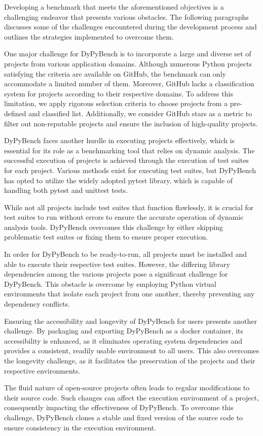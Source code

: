 Developing a benchmark that meets the aforementioned objectives is a challenging endeavor that presents various obstacles. The following paragraphs discusses some of the challenges encountered during the development process and outlines the strategies implemented to overcome them.

One major challenge for DyPyBench is to incorporate a large and diverse set of projects from various application domains.
Although numerous Python projects satisfying the criteria are available on GitHub, the benchmark can only accommodate a limited number of them.
Moreover, GitHub lacks a classification system for projects according to their respective domains.
To address this limitation, we apply rigorous selection criteria to choose projects from a pre-defined and classified list.
Additionally, we consider GitHub stars as a metric to filter out non-reputable projects and ensure the inclusion of high-quality projects.

DyPyBench faces another hurdle in executing projects effectively, which is essential for its role as a benchmarking tool that relies on dynamic analysis.
The successful execution of projects is achieved through the execution of test suites for each project.
Various methods exist for executing test suites, but DyPyBench has opted to utilize the widely adopted pytest library, which is capable of handling both pytest and unittest tests.

While not all projects include test suites that function flawlessly, it is crucial for test suites to run without errors to ensure the accurate operation of dynamic analysis tools.
DyPyBench overcomes this challenge by either skipping problematic test suites or fixing them to ensure proper execution.

In order for DyPyBench to be ready-to-run, all projects must be installed and able to execute their respective test suites.
However, the differing library dependencies among the various projects pose a significant challenge for DyPyBench.
This obstacle is overcome by employing Python virtual environments that isolate each project from one another, thereby preventing any dependency conflicts.

Ensuring the accessibility and longevity of DyPyBench for users presents another challenge.
By packaging and exporting DyPyBench as a docker container, its accessibility is enhanced, as it eliminates operating system dependencies and provides a consistent, readily usable environment to all users.
This also overcomes the longevity challenge, as it facilitates the preservation of the projects and their respective environments.

The fluid nature of open-source projects often leads to regular modifications to their source code.
Such changes can affect the execution environment of a project, consequently impacting the effectiveness of DyPyBench.
To overcome this challenge, DyPyBench clones a stable and fixed version of the source code to ensure consistency in the execution environment.